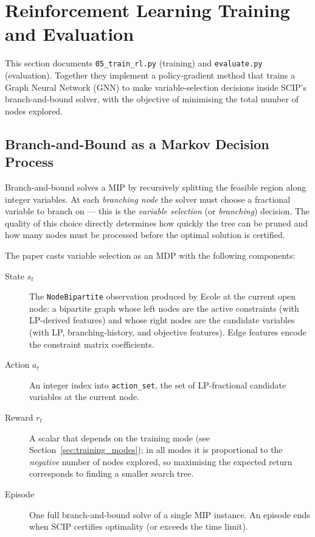\section{Reinforcement Learning Training and Evaluation}

This section documents \texttt{05\_train\_rl.py} (training) and \texttt{evaluate.py} (evaluation). Together they implement a policy-gradient method that trains a Graph Neural Network (GNN) to make variable-selection decisions inside SCIP's branch-and-bound solver, with the objective of minimising the total number of nodes explored.

\subsection{Branch-and-Bound as a Markov Decision Process}

Branch-and-bound solves a MIP by recursively splitting the feasible region along integer variables. At each \emph{branching node} the solver must choose a fractional variable to branch on --- this is the \emph{variable selection} (or \emph{branching}) decision. The quality of this choice directly determines how quickly the tree can be pruned and how many nodes must be processed before the optimal solution is certified.

The paper casts variable selection as an MDP with the following components:

\begin{description}
    \item[State $s_t$] The \texttt{NodeBipartite} observation produced by Ecole at the current open node: a bipartite graph whose left nodes are the active constraints (with LP-derived features) and whose right nodes are the candidate variables (with LP, branching-history, and objective features). Edge features encode the constraint matrix coefficients.
    \item[Action $a_t$] An integer index into \texttt{action\_set}, the set of LP-fractional candidate variables at the current node.
    \item[Reward $r_t$] A scalar that depends on the training mode (see Section~\ref{sec:training_modes}); in all modes it is proportional to the \emph{negative} number of nodes explored, so maximising the expected return corresponds to finding a smaller search tree.
    \item[Episode] One full branch-and-bound solve of a single MIP instance. An episode ends when SCIP certifies optimality (or exceeds the time limit).
\end{description}

